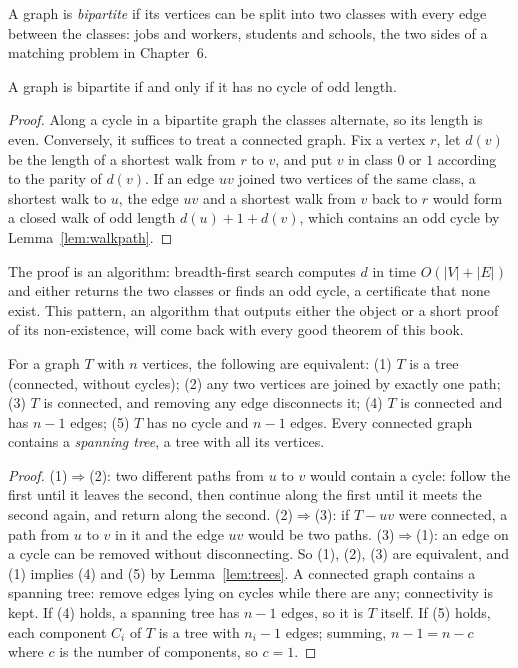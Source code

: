 A graph is \emph{bipartite} if its vertices can be split into two classes with every edge between the classes: jobs and workers,
students and schools, the two sides of a matching problem in Chapter~6.

\begin{theorem}[K\H onig, 1936]\label{thm:bipartite}
A graph is bipartite if and only if it has no cycle of odd length.
\end{theorem}
\begin{proof}
Along a cycle in a bipartite graph the classes alternate, so its length is even. Conversely, it suffices to treat a connected
graph. Fix a vertex $r$, let $d(v)$ be the length of a shortest walk from $r$ to $v$, and put $v$ in class $0$ or $1$ according to the parity of $d(v)$.
If an edge $uv$ joined two vertices of the same class, a shortest walk to $u$, the edge $uv$ and a shortest walk from $v$ back to $r$
would form a closed walk of odd length $d(u)+1+d(v)$, which contains an odd cycle by Lemma~\ref{lem:walkpath}.
\end{proof}

The proof is an algorithm: breadth-first search computes $d$ in time $O(|V|+|E|)$ and either returns the two classes or finds an
odd cycle, a certificate that none exist. This pattern, an algorithm that outputs either the object or a short proof of its
non-existence, will come back with every good theorem of this book.

\begin{proposition}[trees]\label{prop:treechar}
For a graph $T$ with $n$ vertices, the following are equivalent: (1) $T$ is a tree (connected, without cycles); (2) any two
vertices are joined by exactly one path; (3) $T$ is connected, and removing any edge disconnects it; (4) $T$ is connected and
has $n-1$ edges; (5) $T$ has no cycle and $n-1$ edges. Every connected graph contains a \emph{spanning tree}, a tree with all its vertices.
\end{proposition}
\begin{proof}
(1)$\Rightarrow$(2): two different paths from $u$ to $v$ would contain a cycle: follow the first until it leaves the second, then continue
along the first until it meets the second again, and return along the second. (2)$\Rightarrow$(3): if $T-uv$ were connected, a path from $u$ to $v$
in it and the edge $uv$ would be two paths. (3)$\Rightarrow$(1): an edge on a cycle can be removed without disconnecting. So (1), (2), (3) are
equivalent, and (1) implies (4) and (5) by Lemma~\ref{lem:trees}. A connected graph contains a spanning tree: remove edges lying
on cycles while there are any; connectivity is kept. If (4) holds, a spanning tree has $n-1$ edges, so it is $T$ itself. If (5) holds,
each component $C_i$ of $T$ is a tree with $n_i-1$ edges; summing, $n-1=n-c$ where $c$ is the number of components, so $c=1$.
\end{proof}


